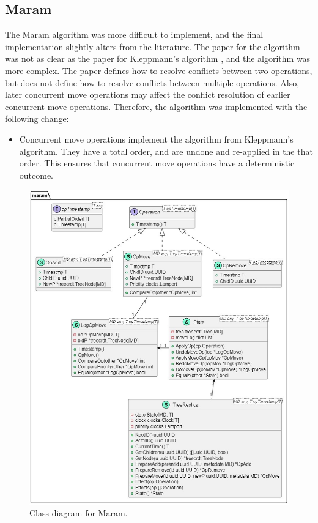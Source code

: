 \documentclass[12pt]{report}
\begin{document}
\subsection{Maram}

The Maram algorithm was more difficult to implement, and the final implementation slightly alters from the literature. The paper for the algorithm \cite{https://doi.org/10.48550/arxiv.2103.04828} was not as clear as the paper for Kleppmann's algorithm \cite{9563274}, and the algorithm was more complex. The paper defines how to resolve conflicts between two operations, but does not define how to resolve conflicts between multiple operations. Also, later concurrent move operations may affect the conflict resolution of earlier concurrent move operations. Therefore, the algorithm was implemented with the following change:

\begin{itemize}
    \item Concurrent move operations implement the algorithm from Kleppmann's algorithm. They have a total order, and are undone and re-applied in the that order. This ensures that concurrent move operations have a deterministic outcome.
\end{itemize}

\begin{figure}[H]
    \centering
    \includegraphics[width=1\textwidth]{images/maram_impl.jpg} 
    \caption{Class diagram for Maram.}
    \label{fig:maram_impl} 
\end{figure} 
\end{document}

